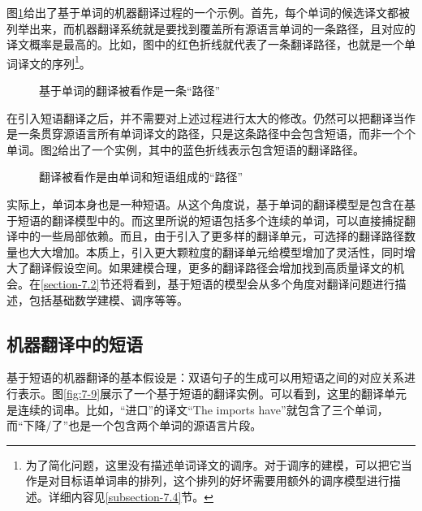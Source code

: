 \parinterval 图\ref{fig:7-4}给出了基于单词的机器翻译过程的一个示例。首先，每个单词的候选译文都被列举出来，而机器翻译系统就是要找到覆盖所有源语言单词的一条路径，且对应的译文概率是最高的。比如，图中的红色折线就代表了一条翻译路径，也就是一个单词译文的序列\footnote[1]{为了简化问题，这里没有描述单词译文的调序。对于调序的建模，可以把它当作是对目标语单词串的排列，这个排列的好坏需要用额外的调序模型进行描述。详细内容见\ref{subsection-7.4}节。}。

\begin{figure}[htp]
\centering

\caption{基于单词的翻译被看作是一条“路径”}
\label{fig:7-4}
\end{figure}

\parinterval 在引入短语翻译之后，并不需要对上述过程进行太大的修改。仍然可以把翻译当作是一条贯穿源语言所有单词译文的路径，只是这条路径中会包含短语，而非一个个单词。图\ref{fig:7-5}给出了一个实例，其中的蓝色折线表示包含短语的翻译路径。

\begin{figure}[htp]
\centering

\caption{翻译被看作是由单词和短语组成的“路径”}
\label{fig:7-5}
\end{figure}

\parinterval 实际上，单词本身也是一种短语。从这个角度说，基于单词的翻译模型是包含在基于短语的翻译模型中的。而这里所说的短语包括多个连续的单词，可以直接捕捉翻译中的一些局部依赖。而且，由于引入了更多样的翻译单元，可选择的翻译路径数量也大大增加。本质上，引入更大颗粒度的翻译单元给模型增加了灵活性，同时增大了翻译假设空间。如果建模合理，更多的翻译路径会增加找到高质量译文的机会。在\ref{section-7.2}节还将看到，基于短语的模型会从多个角度对翻译问题进行描述，包括基础数学建模、调序等等。


\subsection{机器翻译中的短语}

\parinterval 基于短语的机器翻译的基本假设是：双语句子的生成可以用短语之间的对应关系进行表示。图\ref{fig:7-9}展示了一个基于短语的翻译实例。可以看到，这里的翻译单元是连续的词串。比如，“进口”的译文“The imports have”就包含了三个单词，而“下降/了”也是一个包含两个单词的源语言片段。

